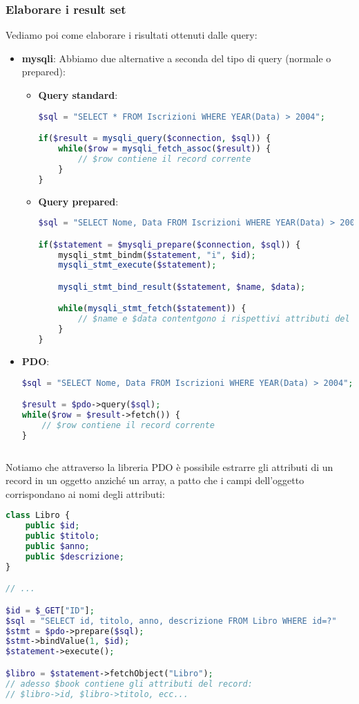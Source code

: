\documentclass[a4paper,11pt]{article}
\begin{document}
\subsubsection{Elaborare i result set}
Vediamo poi come elaborare i risultati ottenuti dalle query:
\begin{itemize}
	\item \textbf{mysqli}:
		Abbiamo due alternative a seconda del tipo di query (normale o prepared):
		\begin{itemize}
			\item \textbf{Query standard}:
\begin{lstlisting}[language=php, style=codestyle]	
$sql = "SELECT * FROM Iscrizioni WHERE YEAR(Data) > 2004";

if($result = mysqli_query($connection, $sql)) {
	while($row = mysqli_fetch_assoc($result)) {
		// $row contiene il record corrente
	}
}
\end{lstlisting}
			\item \textbf{Query prepared}:
\begin{lstlisting}[language=php, style=codestyle]	
$sql = "SELECT Nome, Data FROM Iscrizioni WHERE YEAR(Data) > 2004";

if($statement = $mysqli_prepare($connection, $sql)) {
	mysqli_stmt_bindm($statement, "i", $id);
	mysqli_stmt_execute($statement);

	mysqli_stmt_bind_result($statement, $name, $data);

	while(mysqli_stmt_fetch($statement)) {
		// $name e $data contentgono i rispettivi attributi del record corrente
	}
}
			\end{lstlisting}
		\end{itemize}
	\item \textbf{PDO}:
\begin{lstlisting}[language=php, style=codestyle]	
$sql = "SELECT Nome, Data FROM Iscrizioni WHERE YEAR(Data) > 2004";

$result = $pdo->query($sql);
while($row = $result->fetch()) {
	// $row contiene il record corrente
}
\end{lstlisting}
\begin{lstlisting}[language=php, style=codestyle]	

\end{lstlisting}
\end{itemize}

Notiamo che attraverso la libreria PDO è possibile estrarre gli attributi di un record in un oggetto anziché un array, a patto che i campi dell'oggetto corrispondano ai nomi degli attributi:
\begin{lstlisting}[language=php, style=codestyle]	
class Libro {
	public $id;
	public $titolo;
	public $anno;
	public $descrizione;
}

// ...

$id = $_GET["ID"];
$sql = "SELECT id, titolo, anno, descrizione FROM Libro WHERE id=?"
$stmt = $pdo->prepare($sql);
$stmt->bindValue(1, $id);
$statement->execute();

$libro = $statement->fetchObject("Libro");
// adesso $book contiene gli attributi del record:
// $libro->id, $libro->titolo, ecc...
\end{lstlisting}
\end{document}
